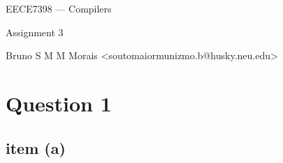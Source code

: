 \documentclass[10pt]{article}
\begin{document}
\begin{center}
\huge EECE7398 --- Compilers

Assignment 3

\vskip1cm

\normalsize\ttfamily Bruno S M M Morais <soutomaiormunizmo.b@husky.neu.edu>


\end{center}

\vskip1cm

\section*{Question 1}
\subsection*{item (a)}
\end{document}
